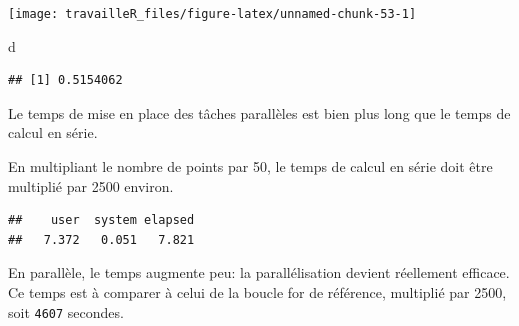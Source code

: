 \documentclass[
  12pt,
  french,
  a4paper,
  extrafontsizes,onecolumn,openright
  ]{memoir}
\newenvironment{Shaded}{\begin{snugshade}}{\end{snugshade}}
\newcommand{\DecValTok}[1]{\textcolor[rgb]{0.00,0.00,0.81}{#1}}
\newcommand{\KeywordTok}[1]{\textcolor[rgb]{0.13,0.29,0.53}{\textbf{#1}}}
\newcommand{\NormalTok}[1]{#1}
\newcommand{\OperatorTok}[1]{\textcolor[rgb]{0.81,0.36,0.00}{\textbf{#1}}}
\newcommand{\StringTok}[1]{\textcolor[rgb]{0.31,0.60,0.02}{#1}}
\begin{document}
\begin{center}\texttt{[image: travailleR\_files/figure-latex/unnamed-chunk-53-1]} \end{center}

\begin{Shaded}
\begin{Highlighting}[]
\NormalTok{d}
\end{Highlighting}
\end{Shaded}

\begin{verbatim}
## [1] 0.5154062
\end{verbatim}

\normalsize

Le temps de mise en place des tâches parallèles est bien plus long que le temps de calcul en série.

En multipliant le nombre de points par 50, le temps de calcul en série doit être multiplié par 2500 environ.

\scriptsize

\begin{Shaded}
\end{Shaded}

\begin{verbatim}
##    user  system elapsed 
##   7.372   0.051   7.821
\end{verbatim}

\normalsize

En parallèle, le temps augmente peu: la parallélisation devient réellement efficace.
Ce temps est à comparer à celui de la boucle for de référence, multiplié par 2500, soit \texttt{4607} secondes.

\scriptsize

\begin{Shaded}
\end{Shaded}
\end{document}
